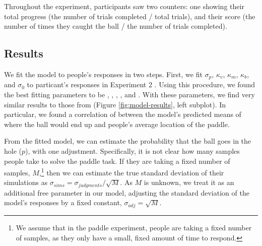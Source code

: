\documentclass[10pt,letterpaper]{article}
\begin{document}
Throughout the experiment, participants saw two counters: one showing their total progress (the number of trials completed / total trials), and their score (the number of times they caught the ball / the number of trials completed).

\subsection{Results}

We fit the model to people's responses in two steps. 
First, we fit $\sigma_p$, $\kappa_v$, $\kappa_m$, $\kappa_b$, and $\sigma_0$ to particant's responses in Experiment 2 \cite<for details, see>{Smith:2013fc}. 
Using this procedure, we found the best fitting parameters to be \perr{}, \kapv{}, \kapm{}, \kapb{}, and \sdzero{}. 
With these parameters, we find very similar results to those from  (Figure \ref{fig:model-results}, left subplot).
In particular, we found a correlation of \PaddleCorr{} between the model's predicted means of where the ball would end up and people's average location of the paddle.

From the fitted model, we can estimate the probability that the ball goes in the hole ($p$), with one adjustment. 
Specifically, it is not clear how many samples people take to solve the paddle task.
If they are taking a fixed number of samples, $M$,\footnote{We assume that in the paddle experiment, people are taking a fixed number of samples, as they only have a small, fixed amount of time to respond.} then we can estimate the true standard deviation of their simulations as $\sigma_{sims} = \sigma_{judgments} / \sqrt{M}$.
As $M$ is unknown, we treat it as an additional free parameter in our model, adjusting the standard deviation of the model's responses by a fixed constant, $\sigma_{adj}=\sqrt{M}$.



\setlength{\bibleftmargin}{.125in}
\setlength{\bibindent}{-\bibleftmargin}


\end{document}
